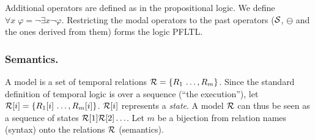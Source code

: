 
\noindent 
Additional operators are defined as in the propositional logic. We define
$\forall x \; \varphi = \neg \exists x \neg \varphi$.
Restricting the modal operators to the past operators
(${\cal S}$, $\ominus$ and the ones derived from them) 
forms the logic PFLTL.

\subsubsection*{Semantics.}
A model is a set of temporal
 relations ${\cal R} = \{ R_1 \, \ldots , R_m \}$.
 Since the standard definition of temporal logic is
 over a sequence (``the execution''), let
 ${\cal R} [ i ] = \{ R_1 [ i ] \, \ldots , R_m [ i ] \}$. ${\cal R} [i]$ represents a {\em state}.
 A model ${\cal R}$ can thus be seen as a sequence
 of states ${\cal R}[1] {\cal R}[2] \ldots$. Let 
 $m$ be a bijection
from relation names (syntax)
onto the relations ${\cal R}$ (semantics).


